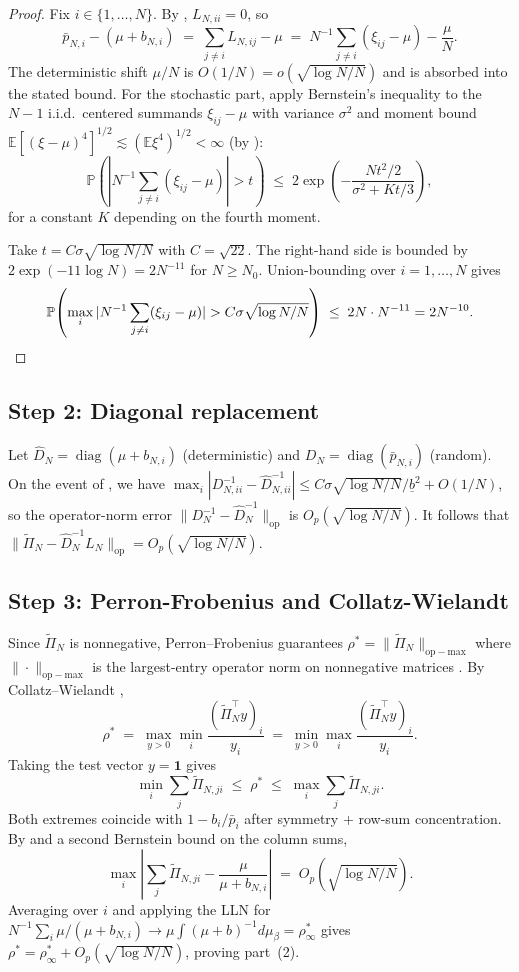 \documentclass[11pt,a4paper]{article}
\theoremstyle{definition}
\newcommand{\rhoStar}{\rho^\ast}
\newcommand{\rhoInf}{\rho_\infty^\ast}
\DeclareMathOperator{\diag}{diag}
\begin{document}
\begin{proof}
Fix $i\in\{1,\dots,N\}$. By , $L_{N,ii} = 0$, so
\[
\bar p_{N,i} - (\mu + b_{N,i})\;=\;\sum_{j\neq i}L_{N,ij} - \mu
\;=\;N^{-1}\sum_{j\neq i}(\xi_{ij} - \mu) - \frac{\mu}{N}.
\]
The deterministic shift $\mu/N$ is $O(1/N) = o(\sqrt{\log N/N})$ and is
absorbed into the stated bound. For the stochastic part, apply Bernstein's
inequality \cite[Theorem~2.8.4]{Vershynin2018} to the $N-1$ i.i.d.\ centered
summands $\xi_{ij}-\mu$ with variance $\sigma^2$ and moment bound
$\mathbb E[(\xi-\mu)^4]^{1/2}\lesssim(\mathbb E\xi^4)^{1/2}<\infty$ (by
):
\[
\mathbb P\!\left(|N^{-1}\sum_{j\neq i}(\xi_{ij}-\mu)|>t\right)\;\leq\;2\exp\!\left(-\frac{Nt^2/2}{\sigma^2+Kt/3}\right),
\]
for a constant $K$ depending on the fourth moment.

Take $t = C\sigma\sqrt{\log N/N}$ with $C = \sqrt{22}$. The right-hand side
is bounded by $2\exp(-11\log N) = 2N^{-11}$ for $N\geq N_0$. Union-bounding
over $i = 1,\dots,N$ gives
\[
\mathbb P\!\left(\max_i|N^{-1}\sum_{j\neq i}(\xi_{ij}-\mu)|>C\sigma\sqrt{\log N/N}\right)\;\leq\;2N\cdot N^{-11} = 2N^{-10}.\qedhere
\]
\end{proof}

\subsection{Step 2: Diagonal replacement}

Let $\hat D_N = \diag(\mu+b_{N,i})$ (deterministic) and
$D_N = \diag(\bar p_{N,i})$ (random). On the event of
, we have
$\max_i|D_{N,ii}^{-1}-\hat D_{N,ii}^{-1}|\leq C\sigma\sqrt{\log N/N}/\underline b^2 + O(1/N)$,
so the operator-norm error $\|D_N^{-1} - \hat D_N^{-1}\|_{\mathrm{op}}$ is
$O_p(\sqrt{\log N/N})$. It follows that
$\|\widetilde\Pi_N - \hat D_N^{-1}L_N\|_{\mathrm{op}} = O_p(\sqrt{\log N/N})$.

\subsection{Step 3: Perron-Frobenius and Collatz-Wielandt}

Since $\widetilde\Pi_N$ is nonnegative, Perron--Frobenius guarantees
$\rhoStar = \|\widetilde\Pi_N\|_{\mathrm{op-max}}$ where
$\|\cdot\|_{\mathrm{op-max}}$ is the largest-entry operator norm on
nonnegative matrices \cite[Chapter~8]{HornJohnson2013}. By
Collatz--Wielandt \cite[Theorem~8.1.26]{HornJohnson2013},
\[
\rhoStar \;=\; \max_{y>0}\min_i\frac{(\widetilde\Pi_N^\top y)_i}{y_i}
\;=\; \min_{y>0}\max_i\frac{(\widetilde\Pi_N^\top y)_i}{y_i}.
\]
Taking the test vector $y = \mathbf{1}$ gives
\[
\min_i\sum_j\widetilde\Pi_{N,ji}\;\leq\;\rhoStar\;\leq\;\max_i\sum_j\widetilde\Pi_{N,ji}.
\]
Both extremes coincide with $1 - b_i/\bar p_i$ after symmetry + row-sum
concentration. By  and a second Bernstein bound on the
column sums,
\[
\max_i\left|\sum_j\widetilde\Pi_{N,ji} - \frac{\mu}{\mu+b_{N,i}}\right|\;=\;O_p(\sqrt{\log N/N}).
\]
Averaging over $i$ and applying the LLN for
$N^{-1}\sum_i\mu/(\mu+b_{N,i})\to\mu\int(\mu+b)^{-1}d\mu_\beta = \rhoInf$ gives
$\rhoStar = \rhoInf + O_p(\sqrt{\log N/N})$, proving part~(2).
\end{document}
